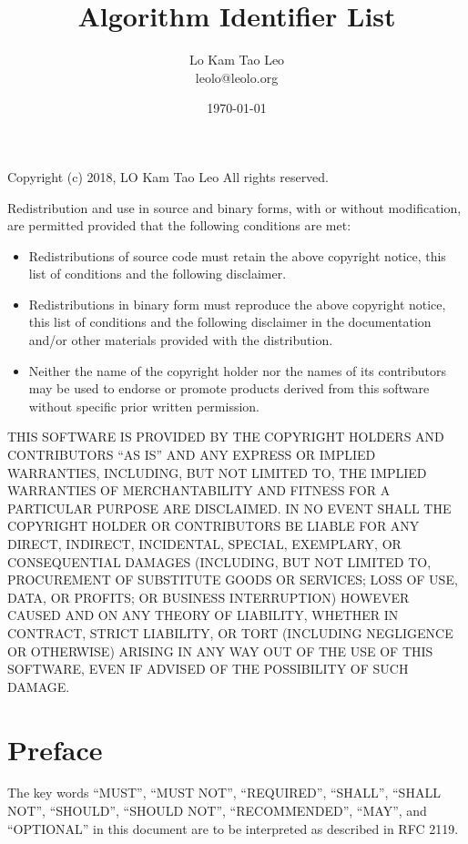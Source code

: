 \documentclass[a4paper,12pt]{article}
\title{Algorithm Identifier List}
\author{Lo Kam Tao Leo\\leolo@leolo.org}
\date{\today}
\begin{document}
	\tableofcontents
	\vspace{25.4mm}
	\noindent
	Copyright (c) 2018, LO Kam Tao Leo
	All rights reserved.
	
	Redistribution and use in source and binary forms, with or without
	modification, are permitted provided that the following conditions are met:
	\begin{itemize}
		\item Redistributions of source code must retain the above copyright notice, this
		list of conditions and the following disclaimer.
		
		\item Redistributions in binary form must reproduce the above copyright notice,
		this list of conditions and the following disclaimer in the documentation
		and/or other materials provided with the distribution.
		
		\item Neither the name of the copyright holder nor the names of its
		contributors may be used to endorse or promote products derived from
		this software without specific prior written permission.
	\end{itemize}

	
	THIS SOFTWARE IS PROVIDED BY THE COPYRIGHT HOLDERS AND CONTRIBUTORS ``AS IS''
	AND ANY EXPRESS OR IMPLIED WARRANTIES, INCLUDING, BUT NOT LIMITED TO, THE
	IMPLIED WARRANTIES OF MERCHANTABILITY AND FITNESS FOR A PARTICULAR PURPOSE ARE
	DISCLAIMED. IN NO EVENT SHALL THE COPYRIGHT HOLDER OR CONTRIBUTORS BE LIABLE
	FOR ANY DIRECT, INDIRECT, INCIDENTAL, SPECIAL, EXEMPLARY, OR CONSEQUENTIAL
	DAMAGES (INCLUDING, BUT NOT LIMITED TO, PROCUREMENT OF SUBSTITUTE GOODS OR
	SERVICES; LOSS OF USE, DATA, OR PROFITS; OR BUSINESS INTERRUPTION) HOWEVER
	CAUSED AND ON ANY THEORY OF LIABILITY, WHETHER IN CONTRACT, STRICT LIABILITY,
	OR TORT (INCLUDING NEGLIGENCE OR OTHERWISE) ARISING IN ANY WAY OUT OF THE USE
	OF THIS SOFTWARE, EVEN IF ADVISED OF THE POSSIBILITY OF SUCH DAMAGE.
	\section{Preface}
	The key words ``MUST'', ``MUST NOT'', ``REQUIRED'', ``SHALL'', ``SHALL
	NOT'', ``SHOULD'', ``SHOULD NOT'', ``RECOMMENDED'',  ``MAY'', and
	``OPTIONAL'' in this document are to be interpreted as described in
	RFC 2119.
\end{document}

